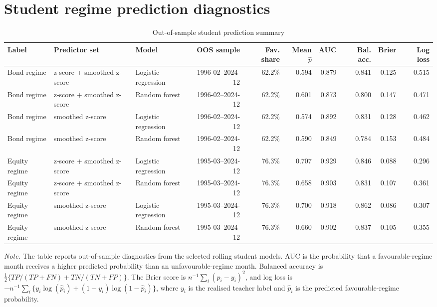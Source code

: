 \section{Student regime prediction diagnostics}
\label{app:student-regime-prediction-diagnostics}

\begin{table}[H]
\centering
\caption{Out-of-sample student prediction summary}
\label{tab:student-oos-prediction-summary}
\scriptsize
\setlength{\tabcolsep}{3.2pt}
\renewcommand{\arraystretch}{1.10}
\begin{adjustbox}{center,max width=\linewidth}
\begin{tabular}{lllrrrrrrr}
\toprule
Label & Predictor set & Model & OOS sample & Fav. share & Mean $\hat p$ & AUC & Bal. acc. & Brier & Log loss \\
\midrule
Bond regime & z-score + smoothed z-score & Logistic regression & 1996-02--2024-12 & 62.2\% & 0.594 & 0.879 & 0.841 & 0.125 & 0.515 \\
Bond regime & z-score + smoothed z-score & Random forest & 1996-02--2024-12 & 62.2\% & 0.601 & 0.873 & 0.800 & 0.147 & 0.471 \\
Bond regime & smoothed z-score & Logistic regression & 1996-02--2024-12 & 62.2\% & 0.574 & 0.892 & 0.831 & 0.128 & 0.462 \\
Bond regime & smoothed z-score & Random forest & 1996-02--2024-12 & 62.2\% & 0.590 & 0.849 & 0.784 & 0.153 & 0.484 \\
Equity regime & z-score + smoothed z-score & Logistic regression & 1995-03--2024-12 & 76.3\% & 0.707 & 0.929 & 0.846 & 0.088 & 0.296 \\
Equity regime & z-score + smoothed z-score & Random forest & 1995-03--2024-12 & 76.3\% & 0.658 & 0.903 & 0.831 & 0.107 & 0.361 \\
Equity regime & smoothed z-score & Logistic regression & 1995-03--2024-12 & 76.3\% & 0.700 & 0.918 & 0.862 & 0.086 & 0.307 \\
Equity regime & smoothed z-score & Random forest & 1995-03--2024-12 & 76.3\% & 0.660 & 0.902 & 0.837 & 0.105 & 0.355 \\
\bottomrule
\end{tabular}
\end{adjustbox}
\vspace{0.45em}
\begin{minipage}{0.97\linewidth}
\footnotesize
\emph{Note.} The table reports out-of-sample diagnostics from the selected rolling student models. AUC is the probability that a favourable-regime month receives a higher predicted probability than an unfavourable-regime month. Balanced accuracy is
\(\frac{1}{2}\{TP/(TP+FN)+TN/(TN+FP)\}\). The Brier score is \(n^{-1}\sum_i(\hat p_i-y_i)^2\), and log loss is \(-n^{-1}\sum_i\{y_i\log(\hat p_i)+(1-y_i)\log(1-\hat p_i)\}\), where \(y_i\) is the realised teacher label and \(\hat p_i\) is the predicted favourable-regime probability.
\end{minipage}
\end{table}

